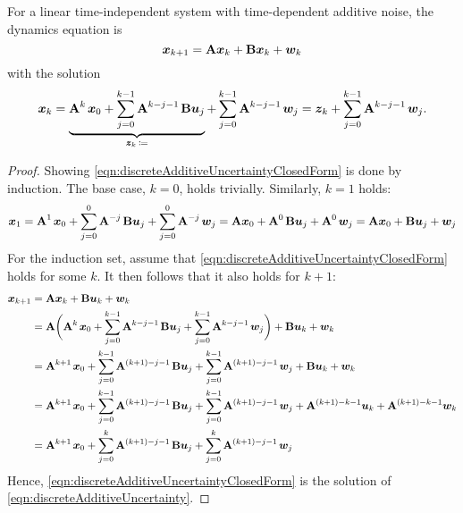 	For a linear time-independent system with time-dependent additive noise, the dynamics equation is
	\begin{equation}
		\bm{x}_{k + 1} = \bm{\mathrm{A}} \bm{x}_k + \bm{\mathrm{B}} \bm{x}_k + \bm{w}_k  \label{eqn:discreteAdditiveUncertainty}
	\end{equation}
	with the solution
	\begin{equation}
		\bm{x}_k
			= \underbrace{\bm{\mathrm{A}}^{k\,} \bm{x}_0 + \sum_{j = 0}^{k - 1} \bm{\mathrm{A}}^{k - j - 1\,} \bm{\mathrm{B}} \bm{u}_j}_{\bm{z}_k \,\coloneqq} + \sum_{j = 0}^{k - 1} \bm{\mathrm{A}}^{k - j - 1\,} \bm{w}_j
			= \bm{z}_k + \sum_{j = 0}^{k - 1} \bm{\mathrm{A}}^{k - j - 1\,} \bm{w}_j.
		\label{eqn:discreteAdditiveUncertaintyClosedForm}
	\end{equation}
	\begin{proof}
		Showing \eqref{eqn:discreteAdditiveUncertaintyClosedForm} is done by induction. The base case, \( k = 0 \), holds trivially. Similarly, \( k = 1 \) holds:
		\begin{equation}
			\bm{x}_1
				= \bm{\mathrm{A}}^{1\,} \bm{x}_0 + \sum_{j = 0}^{0} \bm{\mathrm{A}}^{-j\,} \bm{\mathrm{B}} \bm{u}_j + \sum_{j = 0}^{0} \bm{\mathrm{A}}^{-j\,} \bm{w}_j
				= \bm{\mathrm{A}} \bm{x}_0 + \bm{\mathrm{A}}^{0\,} \bm{\mathrm{B}} \bm{u}_j + \bm{\mathrm{A}}^{0\,} \bm{w}_j
				= \bm{\mathrm{A}} \bm{x}_0 + \bm{\mathrm{B}} \bm{u}_j + \bm{w}_j
		\end{equation}
		For the induction set, assume that \eqref{eqn:discreteAdditiveUncertaintyClosedForm} holds for some \(k\). It then follows that it also holds for \(k + 1\):
		\begin{align}
			\bm{x}_{k + 1}
				&= \bm{\mathrm{A}} \bm{x}_k + \bm{\mathrm{B}} \bm{u}_k + \bm{w}_k \\
				&= \bm{\mathrm{A}} \biggl( \bm{\mathrm{A}}^{k\,} \bm{x}_0 + \sum_{j = 0}^{k - 1} \bm{\mathrm{A}}^{k - j - 1\,} \bm{\mathrm{B}} \bm{u}_j + \sum_{j = 0}^{k - 1} \bm{\mathrm{A}}^{k - j - 1\,} \bm{w}_j \biggr) + \bm{\mathrm{B}} \bm{u}_k + \bm{w}_k \\
				&= \bm{\mathrm{A}}^{k + 1\,} \bm{x}_0 + \sum_{j = 0}^{k - 1} \bm{\mathrm{A}}^{(k + 1) - j - 1\,} \bm{\mathrm{B}} \bm{u}_j + \sum_{j = 0}^{k - 1} \bm{\mathrm{A}}^{(k + 1) - j - 1\,} \bm{w}_j + \bm{\mathrm{B}} \bm{u}_k + \bm{w}_k \\
				&= \bm{\mathrm{A}}^{k + 1\,} \bm{x}_0 + \sum_{j = 0}^{k - 1} \bm{\mathrm{A}}^{(k + 1) - j - 1\,} \bm{\mathrm{B}} \bm{u}_j + \sum_{j = 0}^{k - 1} \bm{\mathrm{A}}^{(k + 1) - j - 1\,} \bm{w}_j + \bm{\mathrm{A}}^{(k + 1) - k - 1} \bm{u}_k + \bm{\mathrm{A}}^{(k + 1) - k - 1} \bm{w}_k \\
				&= \bm{\mathrm{A}}^{k + 1\,} \bm{x}_0 + \sum_{j = 0}^{k} \bm{\mathrm{A}}^{(k + 1) - j - 1\,} \bm{\mathrm{B}} \bm{u}_j + \sum_{j = 0}^{k} \bm{\mathrm{A}}^{(k + 1) - j - 1\,} \bm{w}_j \\
		\end{align}
		Hence, \eqref{eqn:discreteAdditiveUncertaintyClosedForm} is the solution of \eqref{eqn:discreteAdditiveUncertainty}.
	\end{proof}

